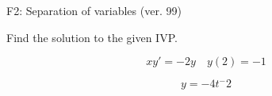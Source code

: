 \begin{exercise}
  \begin{exerciseTitle}F2: Separation of variables (ver. 99)\end{exerciseTitle}
  \begin{exerciseStatement}
    
Find the solution to the given IVP.

    
\[xy'= -2 y \hspace{1em} y( 2 ) = -1\]

  \end{exerciseStatement}
  \begin{exerciseAnswer}
    
\[y= -4 t^ -2\]

  \end{exerciseAnswer}
\end{exercise}